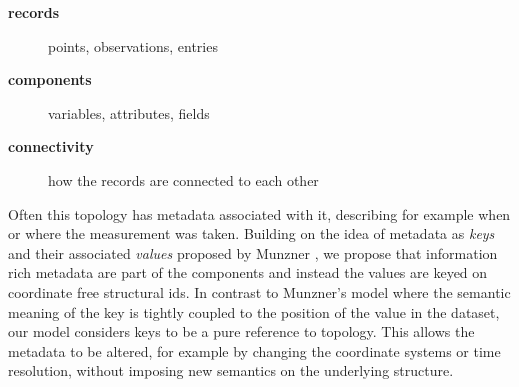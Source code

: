 \documentclass[../main.tex]{subfiles}
\begin{document}
\begin{mdframed}[roundcorner=10pt, frametitle= definitions, frametitlerule=true, frametitlebackgroundcolor=gray!10]
    \begin{description}
        \item[\textbf{records}] points, observations, entries 
        \item[\textbf{components}] variables, attributes, fields 
        \item[\textbf{connectivity}] how the records are connected to each other
    \end{description}
\end{mdframed}

Often this topology has metadata associated with it, describing for example when or where the measurement was taken. Building on the idea of metadata as \textit{keys} and their associated \textit{values} proposed by Munzner \cite{munznerChDataAbstraction}, we propose that information rich metadata are part of the components and instead the values are keyed on coordinate free structural ids. In contrast to Munzner's model where the semantic meaning of the key is tightly coupled to the position of the value in the dataset, our model considers keys to be a pure reference to topology. This allows the metadata to be altered, for example by changing the coordinate systems or time resolution, without imposing new semantics on the underlying structure.
\end{document}
